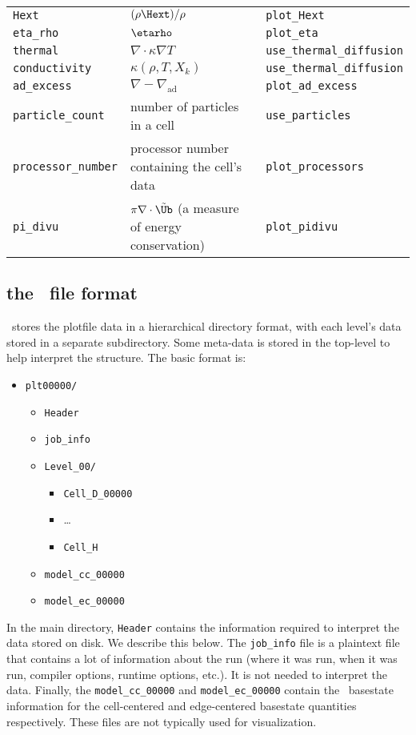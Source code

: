 {\begin{center}
\begin{longtable}{|l|p{2.25in}|p{2.5in}|}
{\tt Hext}             & $(\rho \Hext)/\rho$ & {\tt plot\_Hext} \\
{\tt eta\_rho}         & $\etarho$ & {\tt plot\_eta} \\
{\tt thermal}          & $\nabla \cdot \kappa \nabla T$ & {\tt use\_thermal\_diffusion} \\
{\tt conductivity}     & $\kappa(\rho, T, X_k)$ & {\tt use\_thermal\_diffusion} \\
{\tt ad\_excess}       & $\nabla - \nabla_\mathrm{ad}$ & {\tt plot\_ad\_excess} \\
{\tt particle\_count}  & number of particles in a cell & {\tt use\_particles} \\
{\tt processor\_number} & processor number containing the cell's data & {\tt plot\_processors} \\
{\tt pi\_divu}         & $\pi \nabla \cdot \tilde{\Ub}$ (a measure of energy conservation) & {\tt plot\_pidivu} \\
\end{longtable}
\end{center}
}

\renewcommand{\arraystretch}{1.0}


\subsection{the \boxlib\ file format}

\maestro\ stores the plotfile data in a hierarchical directory format,
with each level's data stored in a separate subdirectory.  Some meta-data
is stored in the top-level to help interpret the structure.  The basic format is:
\begin{itemize}
\item {\tt plt00000/}
  \begin{itemize}
    \item {\tt Header}
    \item {\tt job\_info}
    \item {\tt Level\_00/}
      \begin{itemize}
        \item {\tt Cell\_D\_00000}
        \item {\ldots}
        \item {\tt Cell\_H}
      \end{itemize}
    \item {\tt model\_cc\_00000}
    \item {\tt model\_ec\_00000}
  \end{itemize}
\end{itemize}
%
In the main directory, {\tt Header} contains the information required
to interpret the data stored on disk.  We describe this below.  The
{\tt job\_info} file is a plaintext file that contains a lot of
information about the run (where it was run, when it was run, compiler
options, runtime options, etc.).  It is not needed to interpret the
data.  Finally, the {\tt model\_cc\_00000} and {\tt model\_ec\_00000}
contain the \maestro\ basestate information for the cell-centered and
edge-centered basestate quantities respectively.  These files are not
typically used for visualization.

